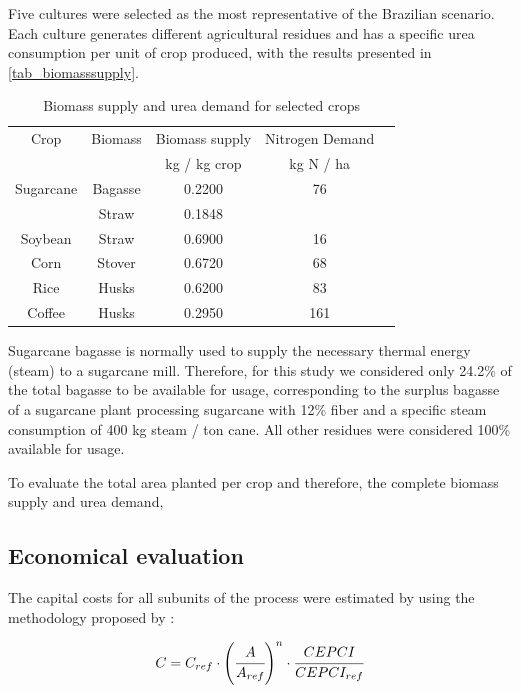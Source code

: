 \documentclass[a4paper, titlepage]{article}
\begin{document}
Five cultures were selected as the most representative of the Brazilian scenario. Each culture generates different
agricultural residues and has a specific urea consumption per unit of crop produced, with the
results presented in \autoref{tab_biomasssupply}.

\begin{table}
	\centering
	\caption{Biomass supply and urea demand for selected crops}
	\label{tab_biomasssupply}
	\begin{tabular}{|c | c | c | c | c|}
		\hline
		Crop & Biomass & Biomass supply \cite{souzaTheoreticalTechnicalAssessment2021} & Nitrogen Demand \cite{IFASTATFertilizerUse} \\
		 & & kg / kg crop & kg N / ha \\
		 \hline
		Sugarcane & Bagasse & 0.2200 & 76 \\ 
		 & Straw & 0.1848 &  \\
		Soybean & Straw & 0.6900 & 16 \\
		Corn & Stover & 0.6720 & 68 \\
		Rice & Husks & 0.6200 & 83 \\
		Coffee & Husks & 0.2950 & 161 \\
		\hline
	\end{tabular}
\end{table}

Sugarcane bagasse is normally used to supply the necessary thermal energy (steam) to a sugarcane mill. Therefore, 
for this study we considered only 24.2\% of the total bagasse to be available for usage, corresponding to the surplus
bagasse of a sugarcane plant processing sugarcane with 12\% fiber and a specific steam consumption of 
400 kg steam / ton cane. All other residues were considered 100\% available for usage. 

To evaluate the total area planted per crop and therefore, the complete biomass supply and urea demand, 



\subsection{Economical evaluation}
The capital costs for all subunits of the process were estimated by using the methodology proposed by
\textcite{turtonAnalysisSynthesisDesign2018}:

\begin{equation}
	C = C_{ref} \cdot \left( \cfrac{A}{A_{ref}} \right)^n \cdot \cfrac{CEPCI}{CEPCI_{ref}}
\end{equation}
\end{document}
